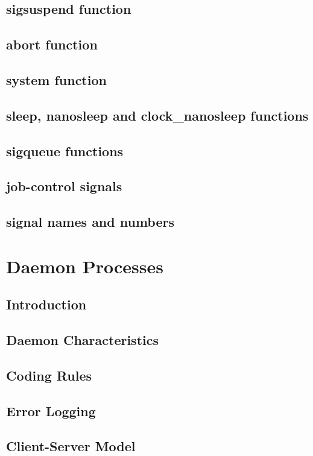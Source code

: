 \documentclass{article}
\begin{document}
	\subsection{sigsuspend function}
	\subsection{abort function}
	\subsection{system function}
	\subsection{sleep, nanosleep and clock\_nanosleep functions}
	\subsection{sigqueue functions}
	\subsection{job-control signals}
	\subsection{signal names and numbers}
	
	\section{Daemon Processes}
	\subsection{Introduction}
	\subsection{Daemon Characteristics}
	\subsection{Coding Rules}
	\subsection{Error Logging}
	\subsection{Client-Server Model}
\end{document}
